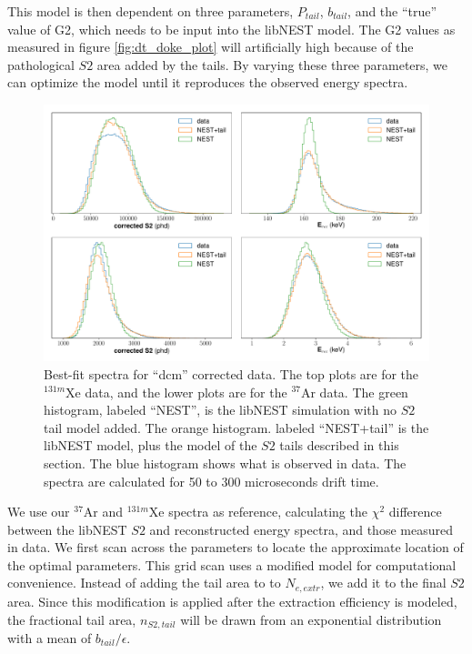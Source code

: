 {This model is then dependent on three parameters, $P_{tail}$, $b_{tail}$, and the ``true'' value of G2, which needs to be input into the libNEST model. The G2 values as measured in figure \ref{fig:dt_doke_plot} will artificially high because of the pathological $S2$ area added by the tails. By varying these three parameters, we can optimize the model until it reproduces the observed energy spectra. 
\begin{figure}[h!]
  \centering
  \includegraphics[width=\textwidth]{Figures/S2tail_hists_dcm.pdf}
\caption{Best-fit spectra for ``dcm'' corrected data.  The top plots are for the $^{131m}$Xe data, and the lower plots are for the $^{37}$Ar data. The green histogram, labeled ``NEST'', is the libNEST simulation with no $S2$ tail model added. The orange histogram. labeled ``NEST+tail'' is the libNEST model, plus the model of the $S2$ tails described in this section. The blue histogram shows what is observed in data. The spectra are calculated for 50 to 300 microseconds drift time. }
\label{fig:s2bestfit_spec_dcm}
\end{figure}


We use our $^{37}$Ar and $^{131m}$Xe spectra as reference, calculating the $\chi^2$ difference between the libNEST $S2$ and reconstructed energy spectra, and those measured in data. We first scan across the parameters to locate the approximate location of the optimal parameters. This grid scan uses a modified model for computational convenience. Instead of adding the tail area to to $N_{e,extr}$, we add it to the final $S2$ area. Since this modification is applied after the extraction efficiency is modeled, the fractional tail area, $n_{S2,tail}$ will be drawn from an exponential distribution with a mean of $b_{tail}/\epsilon$.

}
